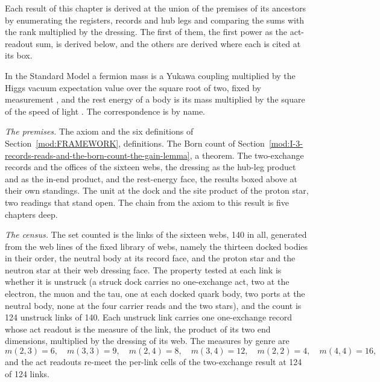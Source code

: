 Each result of this chapter is derived at the union of the premises of its ancestors by enumerating the registers, records and hub legs and comparing the sums with the rank multiplied by the dressing. The first of them, the first power as the act-readout sum, is derived below, and the others are derived where each is cited at its box.
\begin{chbridge}
In the Standard Model a fermion mass is a Yukawa coupling multiplied by the Higgs vacuum expectation value over the square root of two, fixed by measurement \cite{Weinberg1967}, and the rest energy of a body is its mass multiplied by the square of the speed of light \cite{Einstein1905}. The correspondence is by name.
\end{chbridge}
\begin{chproof}
\textit{The premises.} The axiom and the six definitions of Section~\ref{mod:FRAMEWORK}, definitions. The Born count of Section~\ref{mod:I-3-records-reads-and-the-born-count-the-gain-lemma}, a theorem. The two-exchange records and the offices of the sixteen webs, the dressing as the hub-leg product and as the in-end product, and the rest-energy face, the results boxed above at their own standings. The unit at the dock and the site product of the proton star, two readings that stand open. The chain from the axiom to this result is five chapters deep.

\textit{The census.} The set counted is the links of the sixteen webs, 140 in all, generated from the web lines of the fixed library of webs, namely the thirteen docked bodies in their order, the neutral body at its record face, and the proton star and the neutron star at their web dressing face. The property tested at each link is whether it is unstruck (a struck dock carries no one-exchange act, two at the electron, the muon and the tau, one at each docked quark body, two ports at the neutral body, none at the four carrier reads and the two stars), and the count is 124 unstruck links of 140. Each unstruck link carries one one-exchange record whose act readout is the measure of the link, the product of its two end dimensions, multiplied by the dressing of its web. The measures by genre are
\begin{equation}
m(2,3)=6,\quad m(3,3)=9,\quad m(2,4)=8,\quad m(3,4)=12,\quad m(2,2)=4,\quad m(4,4)=16 ,
\end{equation}
and the act readouts re-meet the per-link cells of the two-exchange result at 124 of 124 links.


\end{chproof}
